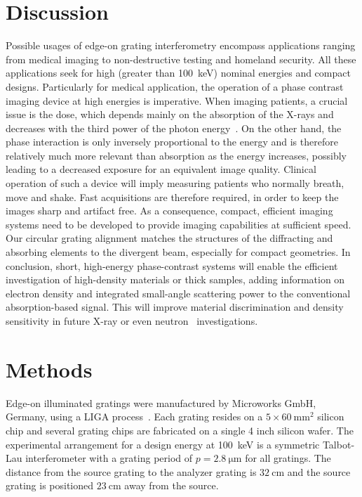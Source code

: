 \section{Discussion}
Possible usages of edge-on grating interferometry encompass applications
ranging from medical imaging to non-destructive testing and homeland
security. All these applications seek for high (greater than
\SI{100}{\kilo\eV}) nominal energies
and compact designs. Particularly for medical application, the operation of
a phase contrast imaging device at high energies is imperative. When imaging
patients, a crucial issue is the dose, which depends mainly on the
absorption of the X-rays and decreases with the third power of the photon
energy~\cite{Momose2005}. On the other hand, the phase interaction is only inversely
proportional to the energy and is therefore relatively much more relevant
than absorption as the energy increases, possibly leading to a decreased
exposure for an equivalent image quality. Clinical operation of such a
device will imply measuring patients who normally breath, move and shake.
Fast acquisitions are therefore required, in order to keep the images sharp
and artifact free. As a consequence, compact, efficient imaging systems need
to be developed to provide imaging capabilities at sufficient speed. Our
circular grating alignment matches the structures of the diffracting and
absorbing elements to the divergent beam, especially for compact geometries.
In conclusion, short, high-energy phase-contrast systems will enable the
efficient investigation of high-density materials or thick samples, adding
information on electron density and integrated small-angle scattering power
to the conventional absorption-based signal. This will improve material
discrimination and density sensitivity in future X-ray or even
neutron~\cite{Grunzweig2008} investigations.

\section{Methods}
Edge-on illuminated gratings were manufactured by Microworks GmbH, Germany, using a LIGA process~\cite{Kenntner2010}. Each grating
resides on a $5 \times \SI{60}{\milli\metre^2}$ silicon chip and several
grating chips are fabricated on a single 4 inch silicon wafer. The
experimental arrangement for a design energy at \SI{100}{\kilo\electronvolt}
is a symmetric Talbot-Lau interferometer with a grating period of $p =
\SI{2.8}{\micro \metre}$ for all gratings. The distance from the source
grating to the analyzer grating is $\SI{32}{\centi\metre}$ and the source
grating is positioned $\SI{23}{\centi\metre}$ away from the source.

